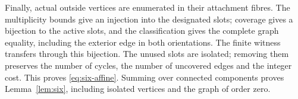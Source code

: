 Finally, actual outside vertices are enumerated in their attachment fibres.
The multiplicity bounds give an injection into the designated slots;
coverage gives a bijection to the active slots, and the classification gives
the complete graph equality, including the exterior edge in both
orientations. The finite witness transfers through this bijection.
The unused slots are isolated; removing them preserves the number of cycles,
the number of uncovered edges and the integer cost. This proves
\eqref{eq:six-affine}. Summing over connected components proves
Lemma~\ref{lem:six}, including isolated vertices and the graph of order zero.

